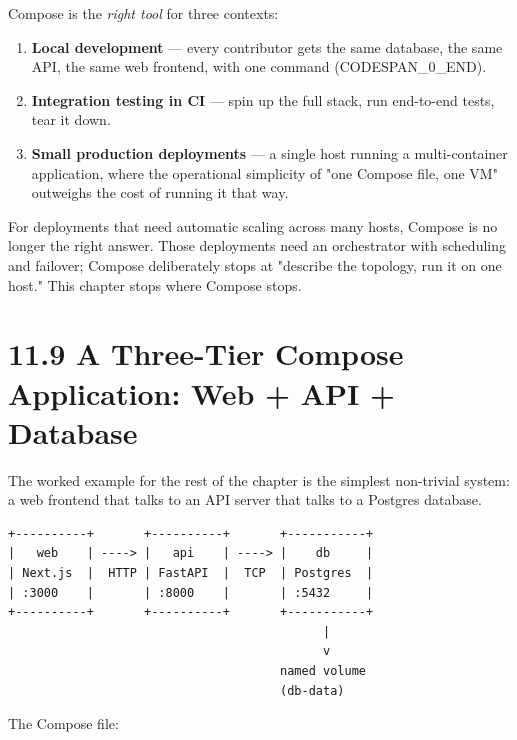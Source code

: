 \documentclass[11pt,a4paper]{book}
\begin{document}
Compose is the \textit{right tool} for three contexts:

\begin{enumerate}
  \item \textbf{Local development} --- every contributor gets the same database, the same API, the same web frontend, with one command (CODESPAN\_0\_END).
  \item \textbf{Integration testing in CI} --- spin up the full stack, run end-to-end tests, tear it down.
  \item \textbf{Small production deployments} --- a single host running a multi-container application, where the operational simplicity of "one Compose file, one VM" outweighs the cost of running it that way.
\end{enumerate}

For deployments that need automatic scaling across many hosts, Compose is no longer the right answer. Those deployments need an orchestrator with scheduling and failover; Compose deliberately stops at "describe the topology, run it on one host." This chapter stops where Compose stops.

\medskip

\section{11.9 A Three-Tier Compose Application: Web + API + Database}

The worked example for the rest of the chapter is the simplest non-trivial system: a web frontend that talks to an API server that talks to a Postgres database.

\begin{lstlisting}
+----------+       +----------+       +-----------+
|   web    | ----> |   api    | ----> |    db     |
| Next.js  |  HTTP | FastAPI  |  TCP  | Postgres  |
| :3000    |       | :8000    |       | :5432     |
+----------+       +----------+       +-----------+
                                            |
                                            v
                                      named volume
                                      (db-data)
\end{lstlisting}

The Compose file:
\end{document}
